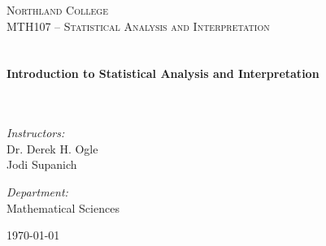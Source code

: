 \dominitoc
\setcounter{minitocdepth}{1} %

\VerbatimFootnotes  %

\begin{titlepage}
\begin{center}

\textsc{\LARGE Northland College}\\[0.5cm]
\textsc{\Large MTH107 -- Statistical Analysis and Interpretation}\\[1.5cm]

\HRuleW \\
\HRule \\[1cm]
{ \huge \bfseries Introduction to Statistical Analysis and Interpretation}\\[1cm]
\HRule \\
\HRuleW \\[1.5cm]

\begin{minipage}{0.4\textwidth}
\begin{flushleft}
  \Large \emph{Instructors:}\\Dr. Derek H. Ogle \\ Jodi Supanich
\end{flushleft}
\end{minipage}
\begin{minipage}{0.4\textwidth}
\begin{flushright} 
  \Large \emph{Department:} \\ Mathematical Sciences
\end{flushright}
\end{minipage}

\vfill

{\Large \today}

\end{center}

\end{titlepage}

